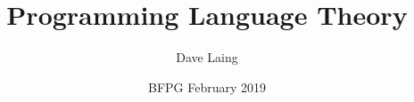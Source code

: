 \documentclass[center,aspectratio=169]{beamer}
\title{Programming Language Theory}
\author{Dave Laing}
\date{BFPG February 2019}
\begin{document}
\begin{frame}
\maketitle
\end{frame}











%
\end{document}
